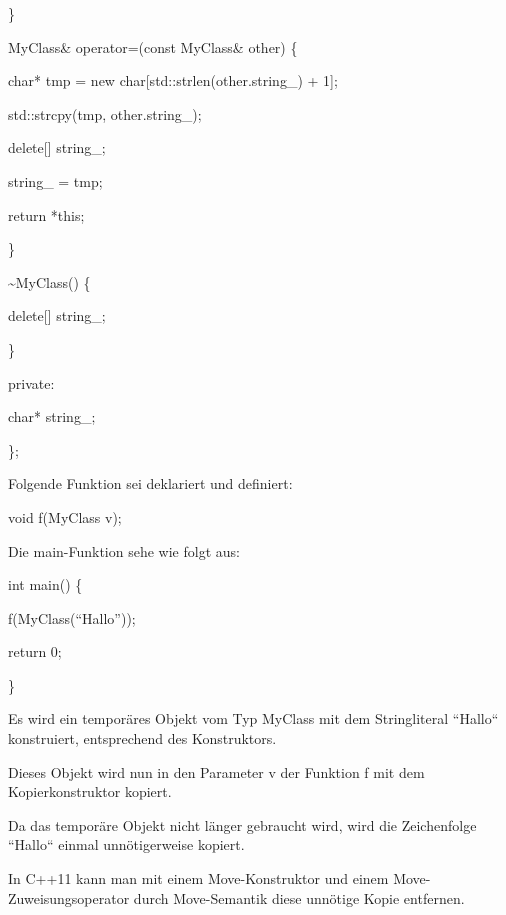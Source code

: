 \documentclass{article}
\begin{document}
\parindent=43pt
\}    

\vspace{12pt}
\parindent=0pt
MyClass\& operator=(const MyClass\& other) \{        

\parindent=28pt
char* tmp = new char[std::strlen(other.string\_) + 1];        

std::strcpy(tmp, other.string\_);        

\parindent=57pt
delete[] string\_;        

\parindent=28pt
string\_ = tmp;        

return *this;    

\parindent=43pt
\}    

\vspace{12pt}
\parindent=14pt
\textasciitilde{}MyClass() \{        

\parindent=28pt
delete[] string\_;    

\parindent=14pt
\}

\vspace{12pt}
\parindent=0pt
private:    

\parindent=14pt
char* string\_;

\parindent=0pt
\};

\vspace{12pt}
Folgende Funktion sei deklariert und definiert:

void f(MyClass v);

\vspace{12pt}
Die main-Funktion sehe wie folgt aus:

int main() \{    

\parindent=14pt
f(MyClass(``Hallo''));    

return 0;

\}

\vspace{12pt}
\parindent=0pt
Es wird ein temporäres Objekt vom Typ MyClass mit dem Stringliteral ``Hallo`` 
konstruiert, entsprechend des Konstruktors.

Dieses Objekt wird nun in den Parameter v der Funktion f mit dem Kopierkonstruktor 
kopiert.

\vspace{12pt}
Da das temporäre Objekt nicht länger gebraucht wird, wird die Zeichenfolge ``Hallo`` 
einmal unnötigerweise kopiert.

\vspace{12pt}
In C++11 kann man mit einem Move-Konstruktor und einem Move-Zuweisungsoperator 
durch Move-Semantik diese unnötige Kopie entfernen.
\end{document}

